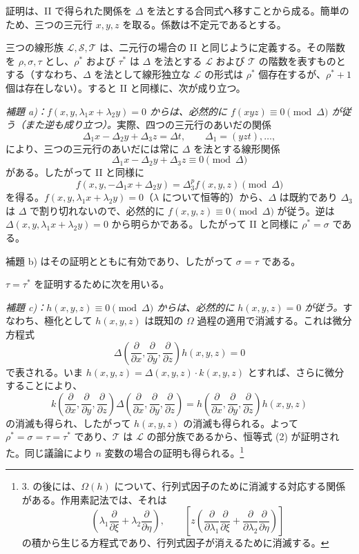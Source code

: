 \documentclass[11pt]{article}
\begin{document}
証明は、II で得られた関係を $\Delta$ を法とする合同式へ移すことから成る。簡単のため、三つの三元行 $x,y,z$ を取る。係数は不定元であるとする。

三つの線形族 $\mathcal L,\mathcal S,\mathcal T$ は、二元行の場合の II と同じように定義する。その階数を $\rho,\sigma,\tau$ とし、$\rho^*$ および $\tau^*$ は $\Delta$ を法とする $\mathcal L$ および $\mathcal T$ の階数を表すものとする（すなわち、$\Delta$ を法として線形独立な $\mathcal L$ の形式は $\rho^*$ 個存在するが、$\rho^*+1$ 個は存在しない）。すると II と同様に、次が成り立つ。

\emph{補題 a)：$f(x,y,\lambda_1x+\lambda_2y)=0$ からは、必然的に $f(xyz)\equiv0\pmod{\Delta}$ が従う（また逆も成り立つ）。}実際、四つの三元行のあいだの関係
\[
  \Delta_1x-\Delta_2y+\Delta_3z=\Delta t,
  \qquad \Delta_1=(yzt),\ldots,
\]
により、三つの三元行のあいだには常に $\Delta$ を法とする線形関係
\[
  \Delta_1x-\Delta_2y+\Delta_3z\equiv0\pmod{\Delta}
\]
がある。したがって II と同様に
\[
  f(x,y,-\Delta_1x+\Delta_2y)=\Delta_3^p f(x,y,z)\pmod{\Delta}
\]
を得る。$f(x,y,\lambda_1x+\lambda_2y)=0$（$\lambda$ について恒等的）から、$\Delta$ は既約であり $\Delta_3$ は $\Delta$ で割り切れないので、必然的に $f(x,y,z)\equiv0\pmod{\Delta}$ が従う。逆は $\Delta(x,y,\lambda_1x+\lambda_2y)=0$ から明らかである。したがって II と同様に $\rho^*=\sigma$ である。

補題 b) はその証明とともに有効であり、したがって $\sigma=\tau$ である。

$\tau=\tau^*$ を証明するために次を用いる。

\emph{補題 c)：$h(x,y,z)\equiv0\pmod{\Delta}$ からは、必然的に $h(x,y,z)=0$ が従う。}すなわち、極化として $h(x,y,z)$ は既知の $\Omega$ 過程の適用で消滅する。これは微分方程式
\[
  \Delta\!\left(\frac{\partial}{\partial x},\frac{\partial}{\partial y},\frac{\partial}{\partial z}\right)h(x,y,z)=0
\]
で表される。いま $h(x,y,z)=\Delta(x,y,z)\cdot k(x,y,z)$ とすれば、さらに微分することにより、
\[
  k\!\left(\frac{\partial}{\partial x},\frac{\partial}{\partial y},\frac{\partial}{\partial z}\right)
  \Delta\!\left(\frac{\partial}{\partial x},\frac{\partial}{\partial y},\frac{\partial}{\partial z}\right)
  =
  h\!\left(\frac{\partial}{\partial x},\frac{\partial}{\partial y},\frac{\partial}{\partial z}\right)h(x,y,z)
\]
の消滅も得られ、したがって $h(x,y,z)$ の消滅も得られる。よって $\rho^*=\sigma=\tau=\tau^*$ であり、$\mathcal T$ は $\mathcal L$ の部分族であるから、恒等式 (2) が証明された。同じ議論により $n$ 変数の場合の証明も得られる。\footnote{3. の後には、$\Omega(h)$ について、行列式因子のために消滅する対応する関係がある。作用素記法では、それは
\[
 \left(\lambda_1\frac{\partial}{\partial \xi}+\lambda_2\frac{\partial}{\partial \eta}\right),
 \qquad
 \left[z\left(\frac{\partial}{\partial\lambda_1}\frac{\partial}{\partial \xi}
 +\frac{\partial}{\partial\lambda_2}\frac{\partial}{\partial \eta}\right)\right]
\]
の積から生じる方程式であり、行列式因子が消えるために消滅する。}
\end{document}

